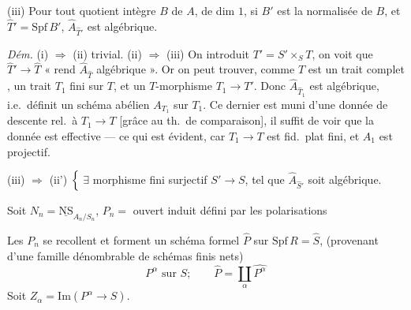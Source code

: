 \documentclass[11pt,a4paper]{article}
\begin{document}
(iii) Pour tout  quotient intègre $B$ de
$A$, de dim $1$, si $B'$ est la normalisée de $B$, et \struck{\ill{}}
$\hat{T}' = \mathrm{Spf}\,B'$, $\hat{A}_{\hat{T}'}$ est algébrique.



\emph{Dém.} (i) $\Rightarrow$ (ii) trivial. (ii) $\Rightarrow$ (iii) On
introduit $T' = S' \times_S T$, on voit que $\hat{T}' \to \hat{T}$ « rend
$\hat{A}_{\hat{T}}$ algébrique ». Or on peut trouver, comme $T$ est un
trait complet , un  trait $T_1$ fini sur $T$, et un
$T$-morphisme $T_1 \to T'$. Donc $\hat{A}_{\hat{T}_1}$ est algébrique, i.e.\
définit un schéma abélien $A_{T_1}$ sur $T_1$. Ce dernier est muni d'une
donnée de descente rel.\ à $T_1 \to T$ [grâce au th.\ de comparaison], il
suffit de voir que la donnée est effective --- ce qui est évident, car
$T_1 \to T$ est fid.\ plat fini, et $A_1$ est projectif.


(iii) $\Rightarrow$ (ii') $\Bigl\{$ $\exists$ morphisme \struck{\ill{}} fini
surjectif \uncertain{net} $S' \to S$, tel que $\hat{A}_{\hat{S}'}$ soit algébrique.

Soit  $N_n = \underline{\mathrm{NS}}_{A_n/S_n}$,
$P_n =$ \struck{\ill{}} ouvert induit défini par les
polarisations \struck{\ill{}}

Les $P_n$ se recollent et forment un schéma formel $\hat{P}$ sur
$\mathrm{Spf}\,R = \hat{S}$, \struck{\ill{}} (provenant d'une famille
dénombrable de schémas finis nets)
\[
  P^{\alpha} \text{ sur } S ; \qquad
  \hat{P} = \coprod_{\alpha} \widehat{P^{\alpha}}
\]
Soit  $Z_{\alpha} = \mathrm{Im}(P^{\alpha} \to S)$.
\end{document}
